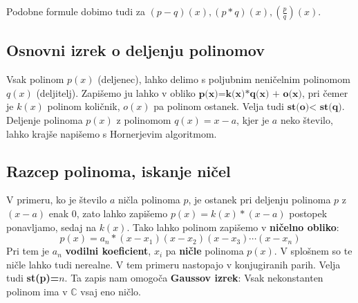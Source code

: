 Podobne formule dobimo tudi za $(p-q)(x), (p*q)(x), (\frac{p}{q})(x)$.
\subsection{Osnovni izrek o deljenju polinomov}
Vsak polinom $p(x)$ (deljenec), lahko delimo s poljubnim neničelnim polinomom $q(x)$ (deljitelj). Zapišemo ju lahko v obliko $\textbf{p(x)=k(x)*q(x) + o(x)}$, pri čemer je $k(x)$ polinom količnik, $o(x)$ pa polinom ostanek. Velja tudi $\textbf{st(o)< st(q)}$. Deljenje polinoma $p(x)$ z polinomom $q(x)=x-a$, kjer je $a$ neko število, lahko krajše napišemo s Hornerjevim algoritmom.
\subsection{Razcep polinoma, iskanje ničel}
V primeru, ko je število $a$ ničla polinoma $p$, je ostanek pri deljenju polinoma $p$ z $(x-a)$ enak $0$, zato lahko zapišemo $p(x)= k(x)*(x-a)$ postopek ponavljamo, sedaj na $k(x)$. Tako lahko polinom zapišemo v \textbf{ničelno obliko}: 
\[
p(x)= a_n*(x-x_1)(x-x_2)(x-x_3)\cdots(x-x_n)
\]
Pri tem je $a_n$ \textbf{vodilni koeficient}, $x_i$ pa \textbf{ničle} polinoma $p(x)$. V splošnem so te ničle lahko tudi nerealne. V tem primeru nastopajo v konjugiranih parih. Velja tudi \textbf{st(p)=$n$}. Ta zapis nam omogoča \textbf{Gaussov izrek}: Vsak nekonstanten polinom ima v $\mathbb{C}$ vsaj eno ničlo.

